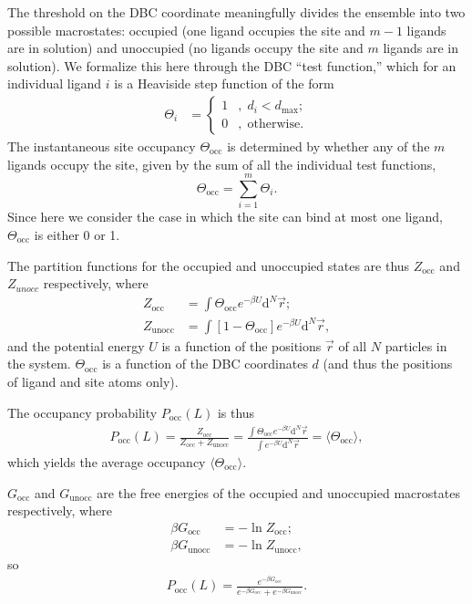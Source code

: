 \documentclass[9pt,tutorial,pubversion]{Styling/livecoms}
\begin{document}
The threshold on the DBC coordinate meaningfully divides the ensemble into two possible macrostates: occupied (one ligand occupies the site and $m-1$ ligands are in solution) and unoccupied (no ligands occupy the site and $m$ ligands are in solution).  We formalize this here through the DBC ``test function,'' which for an individual ligand $i$ is a Heaviside step function  of the form 
\begin{align} \label{eq:test_fnc1}
   \Theta_i &= \begin{cases}
        1 &, \; d_{i} < d_\mathrm{max};\\
        0 &, \; \text{otherwise}.
    \end{cases}
\end{align}
The instantaneous site occupancy $\Theta_\mathrm{occ}$ is determined by whether any of the $m$ ligands occupy the site, given by the sum of all the individual test functions,
\begin{equation}\label{eq:test_fnc2}
   \Theta_\mathrm{occ}=\sum_{i=1}^m\Theta_i. 
\end{equation}
Since here we consider the case in which the site can bind at most one ligand, $\Theta_\mathrm{occ}$ is either 0 or 1.  

The  partition functions for the occupied and unoccupied states are thus $Z_\mathrm{occ}$ and $Z_{unocc}$ respectively, where 
\begin{align}
    Z_{\mathrm{occ}} &=\int \Theta_\mathrm{occ}e^{-\beta U} \mathrm{d}^N\vec{r};\label{eq:partition1}\\ 
    Z_{\mathrm{unocc}} &= \int \left[1-\Theta_\mathrm{occ}\right]e^{-\beta U} \mathrm{d}^N\vec{r} , \label{eq:partition2}
\end{align}
and the potential energy $U$ is a function of the positions $\vec{r}$ of all $N$ particles in the system. $\Theta_\mathrm{occ}$ is a function of the DBC coordinates $d$ (and thus the positions of ligand and site atoms only).  

The occupancy probability $P_\mathrm{occ}(L)$ is thus  
\begin{align}\label{eq:probability1.5}
    P_\mathrm{occ}(L)=\frac{Z_{\mathrm{occ}}} {Z_{\mathrm{occ}} + Z_{\mathrm{unocc}}}=\frac{\int \Theta_\mathrm{occ} e^{-\beta U} \mathrm{d}^N\vec{r}} {\int e^{-\beta U}\mathrm{d}^N\vec{r}}=\langle \Theta_\mathrm{occ}\rangle,
\end{align} 
which yields the average occupancy $\langle \Theta_\mathrm{occ}\rangle$.  

$G_\mathrm{occ}$ and $G_\mathrm{unocc}$ are the free energies of the occupied and unoccupied macrostates respectively, where
\begin{align}
    \beta G_\mathrm{occ}&=-\ln Z_\mathrm{occ};\\
    \beta G_\mathrm{unocc}&=-\ln Z_\mathrm{unocc},
\end{align}
 so 
\begin{align}
    P_\mathrm{occ}(L)=\frac{e^{-\beta G_\mathrm{occ}}} {e^{-\beta G_\mathrm{occ}} + e^{-\beta G_\mathrm{unocc}}}.\label{eq:ApE:probability2}
\end{align}
\end{document}
